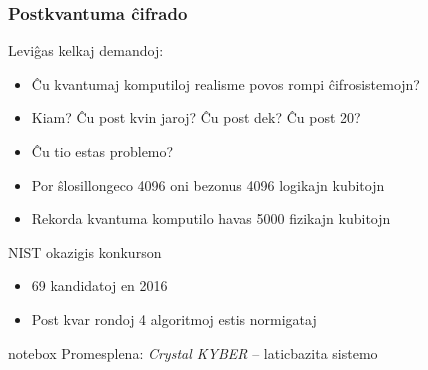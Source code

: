 \documentclass[utf8, aspectratio=169]{beamer}
\begin{document}
\begin{frame}
  \frametitle{Postkvantuma ĉifrado}
  Leviĝas kelkaj demandoj:
  \begin{itemize}
  \item<+-> Ĉu kvantumaj komputiloj realisme povos rompi ĉifrosistemojn?
  \item<+-> Kiam? Ĉu post kvin jaroj? Ĉu post dek? Ĉu post 20?
  \item<+-> Ĉu tio estas problemo?
  \item<+-> Por ŝlosillongeco 4096 oni bezonus 4096 logikajn kubitojn
  \item<+-> Rekorda kvantuma komputilo havas 5000 fizikajn kubitojn
  \end{itemize}

  \vspace{1em}
  \pause
  NIST okazigis konkurson

  \begin{itemize}
  \item<+-> 69 kandidatoj en 2016
  \item<+-> Post kvar rondoj 4 algoritmoj estis normigataj
  \end{itemize}
  \pause

  \begin{beamercolorbox}[center, rounded=true, shadow=true]{notebox}
    Promesplena: \emph{Crystal KYBER} – laticbazita sistemo
  \end{beamercolorbox}

\end{frame}
\end{document}
